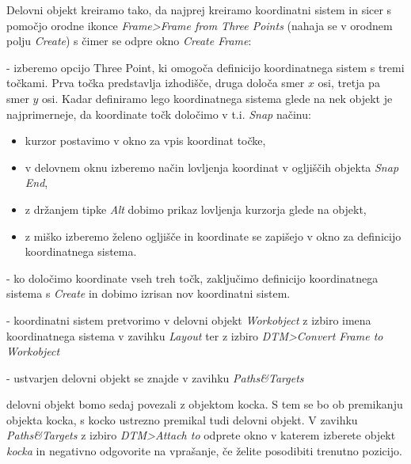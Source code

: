 \noindent Delovni objekt kreiramo tako, da najprej kreiramo koordinatni sistem
in sicer s pomočjo orodne ikonce \emph{Frame>Frame from Three Points} (nahaja se v orodnem polju \emph{Create}) s čimer
se odpre okno \emph{Create Frame}:
\begin{description}
\item \vspace*{-0.2cm} - izberemo opcijo Three Point, ki omogoča
definicijo koordinatnega sistem s tremi točkami. Prva točka
predstavlja izhodišče, druga določa smer $x$ osi, tretja pa smer $y$
osi. Kadar definiramo lego koordinatnega sistema glede na nek objekt
je najprimerneje, da koordinate točk določimo v t.i. \emph{Snap}
načinu:
\begin{itemize}
    \item \vspace*{-0.2cm} kurzor postavimo v okno za vpis koordinat točke,
    \item \vspace*{-0.2cm} v delovnem oknu izberemo
    način lovljenja koordinat v ogljiščih objekta \emph{Snap End},
\item \vspace*{-0.2cm} z držanjem tipke \emph{Alt} dobimo prikaz
lovljenja kurzorja glede na objekt,
    \item \vspace*{-0.2cm} z miško izberemo želeno ogljišče in koordinate se zapišejo v okno za definicijo koordinatnega sistema.
\end{itemize}

\item \vspace*{-0.2cm} - ko določimo koordinate vseh treh točk,
zaključimo definicijo koordinatnega sistema s \emph{Create} in dobimo
izrisan nov koordinatni sistem.

\item \vspace*{-0.2cm} - koordinatni sistem pretvorimo v delovni
objekt \emph{Workobject} z izbiro imena koordinatnega sistema v
zavihku \emph{Layout} ter z izbiro \emph{DTM>Convert Frame to
Workobject}

\item \vspace*{-0.2cm} - ustvarjen delovni objekt se znajde v
zavihku \emph{Paths\&Targets}

\item delovni objekt bomo sedaj povezali z objektom kocka. S tem se bo ob premikanju objekta kocka, s kocko ustrezno premikal tudi delovni objekt. V zavihku \emph{Paths\&Targets} z izbiro \emph{DTM>Attach to} odprete okno v katerem izberete objekt \emph{kocka} in negativno odgovorite na vprašanje, če želite posodibiti trenutno pozicijo.
\end{description}

